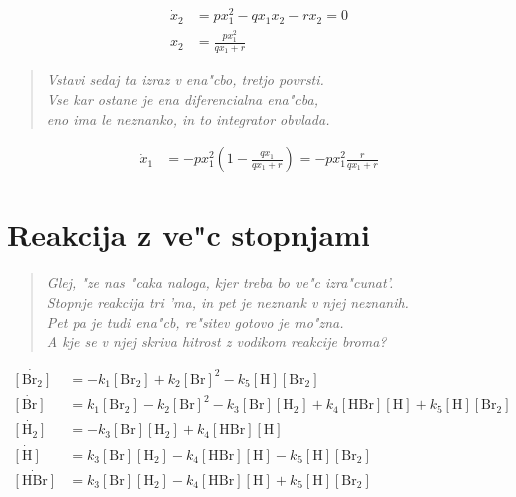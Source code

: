 \documentclass[a4paper,10pt]{article}
\begin{document}
\begin{align}
 \dot x_2 &= p x_1^2 - q x_1 x_2 - r x_2 = 0\\
 x_2 &= \frac{px_1^2}{qx_1 + r}
\end{align}

\begin{verse}
\textit{Vstavi sedaj ta izraz v ena"cbo, tretjo povrsti. \\%
Vse kar ostane je ena diferencialna ena"cba, \\
eno ima le neznanko, in to integrator obvlada. }
\end{verse}

\begin{align}
\dot x_1 &= -p x_1^2 \left( 1 - \frac{qx_1}{qx_1 + r} \right) = -px_1^2 \frac{r}{qx_1 + r}
\end{align}

\begin{figure}
 
\end{figure}


\section{Reakcija z ve"c stopnjami}

\begin{verse}
\textit{Glej, "ze nas "caka naloga, kjer treba bo ve"c izra"cunat'.  \\
Stopnje reakcija tri 'ma, in pet je neznank v njej neznanih. \\
Pet pa je tudi ena"cb, re"sitev gotovo je mo"zna. \\
A kje se v njej skriva hitrost z vodikom reakcije broma?  }
\end{verse}

\begin{align}
 \dot{[\mathrm{Br_2}]} &= - k_1 [\mathrm{Br_2}] + k_2 [\mathrm{Br}]^2 - k_5 [\mathrm{H}] [\mathrm{Br_2}] \\
 \dot{[\mathrm{Br}]} &= k_1 [\mathrm{Br_2}] - k_2 [\mathrm{Br}]^2 - k_3 [\mathrm{Br}] [\mathrm{H_2}] + k_4 [\mathrm{HBr}] [\mathrm{H}] + k_5 [\mathrm{H}] [\mathrm{Br_2}]\\
 \dot{[\mathrm{H_2}]} &= - k_3 [\mathrm{Br}] [\mathrm{H_2}] + k_4 [\mathrm{HBr}] [\mathrm{H}] \\
 \dot{[\mathrm{H}]} &= k_3 [\mathrm{Br}] [\mathrm{H_2}] - k_4 [\mathrm{HBr}] [\mathrm{H}] - k_5 [\mathrm{H}] [\mathrm{Br_2}]\\
\dot{[\mathrm{HBr}]} &= k_3 [\mathrm{Br}] [\mathrm{H_2}] - k_4 [\mathrm{HBr}] [\mathrm{H}] + k_5 [\mathrm{H}] [\mathrm{Br_2}]
\end{align}
\end{document}
